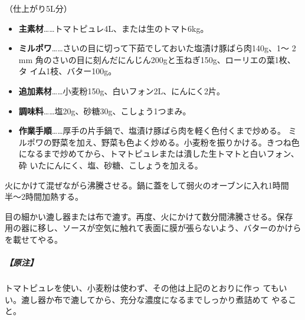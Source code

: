 \documentclass[twoside,12Q,b5j]{escoffierltjsbook}
\begin{document}
（仕上がり5L分）

\begin{itemize}
\item
  \textbf{主素材}\ldots{}\ldots{}トマトピュレ4L、または生のトマト6kg。
\item
  \textbf{ミルポワ}\ldots{}\ldots{}さいの目に切って下茹でしておいた塩漬け豚ばら肉140g、1〜
  2 mm 角のさいの目に刻んだにんじん200gと玉ねぎ150g、ローリエの葉1枚、タ
  イム1枝、バター100g。
\item
  \textbf{追加素材}\ldots{}\ldots{}小麦粉150g、白いフォン2L、にんにく2片。
\item
  \textbf{調味料}\ldots{}\ldots{}塩20g、砂糖30g、こしょう1つまみ。
\item
  \textbf{作業手順}\ldots{}\ldots{}厚手の片手鍋で、塩漬け豚ばら肉を軽く色付くまで炒める。
  ミルポワの野菜を加え、野菜も色よく炒める。小麦粉を振りかける。きつね色
  になるまで炒めてから、トマトピュレまたは潰した生トマトと白いフォン、砕
  いたにんにく、塩、砂糖、こしょうを加える。
\end{itemize}

火にかけて混ぜながら沸騰させる。鍋に蓋をして弱火のオーブンに入れ1時間
半〜2時間加熱する。

目の細かい漉し器または布で漉す。再度、火にかけて数分間沸騰させる。保存
用の器に移し、ソースが空気に触れて表面に膜が張らないよう、バターのかけら
を載せてやる。

\subparagraph{【原注】}\label{ux539fux6ce8-4}

トマトピュレを使い、小麦粉は使わず、その他は上記のとおりに作っ
てもいい。漉し器か布で漉してから、充分な濃度になるまでしっかり煮詰めて
やること。


{\printindex}
\end{document}
